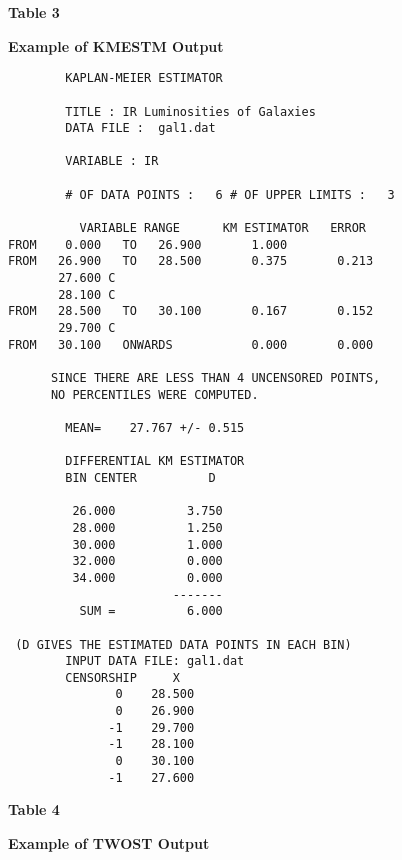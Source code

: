 \centerline{\Large\bf Table 3}

\bigskip

\centerline{\large\bf Example of KMESTM Output}

\bigskip

\begin{small}
\begin{verbatim}
        KAPLAN-MEIER ESTIMATOR
    
        TITLE : IR Luminosities of Galaxies                                                     
        DATA FILE :  gal1.dat
    
        VARIABLE : IR       
    
        # OF DATA POINTS :   6 # OF UPPER LIMITS :   3
    
          VARIABLE RANGE      KM ESTIMATOR   ERROR
FROM    0.000   TO   26.900       1.000
FROM   26.900   TO   28.500       0.375       0.213
       27.600 C 
       28.100 C 
FROM   28.500   TO   30.100       0.167       0.152
       29.700 C 
FROM   30.100   ONWARDS           0.000       0.000

      SINCE THERE ARE LESS THAN 4 UNCENSORED POINTS,
      NO PERCENTILES WERE COMPUTED.
    
        MEAN=    27.767 +/- 0.515
  
        DIFFERENTIAL KM ESTIMATOR
        BIN CENTER          D
  
         26.000          3.750
         28.000          1.250
         30.000          1.000
         32.000          0.000
         34.000          0.000
                       -------
          SUM =          6.000
  
 (D GIVES THE ESTIMATED DATA POINTS IN EACH BIN)
        INPUT DATA FILE: gal1.dat 
        CENSORSHIP     X 
               0    28.500
               0    26.900
              -1    29.700
              -1    28.100
               0    30.100
              -1    27.600

\end{verbatim}
\end{small}
\newpage


\centerline{\Large\bf Table 4}

\bigskip

\centerline{\large\bf Example of TWOST Output}

\bigskip

